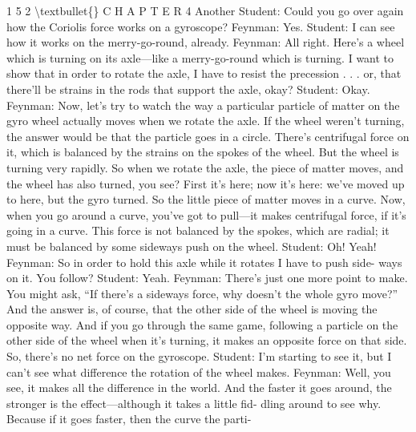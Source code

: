 \documentclass[10pt,oneside]{article}
\begin{document}
1 5 2 \textbackslash{}textbullet\{\} C H A P T E R  4 Another Student: Could you go over again how the Coriolis force works on a gyroscope? Feynman: Yes. Student: I can see how it works on the merry-go-round, already. Feynman: All right. Here’s a wheel which is turning on its axle---like a merry-go-round which is turning. I want to show that in order to rotate the axle, I have to resist the precession . . . or, that there’ll be strains in the rods that support the axle, okay? Student: Okay. Feynman: Now, let’s try to watch the way a particular particle of matter on the gyro wheel actually moves when we rotate the axle. If the wheel weren’t turning, the answer would be that the particle goes in a circle. There’s centrifugal force on it, which is balanced by the strains on the spokes of the wheel. But the wheel is turning very rapidly. So when we rotate the axle, the piece of matter moves, and the wheel has also turned, you see? First it’s here; now it’s here: we’ve moved up to here, but the gyro turned. So the little piece of matter moves in a curve. Now, when you go around a curve, you’ve got to pull---it makes centrifugal force, if it’s going in a curve. This force is not balanced by the spokes, which are radial; it must be balanced by some sideways push on the wheel. Student: Oh! Yeah! Feynman: So in order to hold this axle while it rotates I have to push side- ways on it. You follow? Student: Yeah. Feynman: There’s just one more point to make. You might ask, “If there’s a sideways force, why doesn’t the whole gyro move?” And the answer is, of course, that the other side of the wheel is moving the opposite way. And if you go through the same game, following a particle on the other side of the wheel when it’s turning, it makes an opposite force on that side. So, there’s no net force on the gyroscope. Student: I’m starting to see it, but I can’t see what difference the rotation of the wheel makes. Feynman: Well, you see, it makes all the difference in the world. And the faster it goes around, the stronger is the effect---although it takes a little fid- dling around to see why. Because if it goes faster, then the curve the parti-\par
\end{document}
